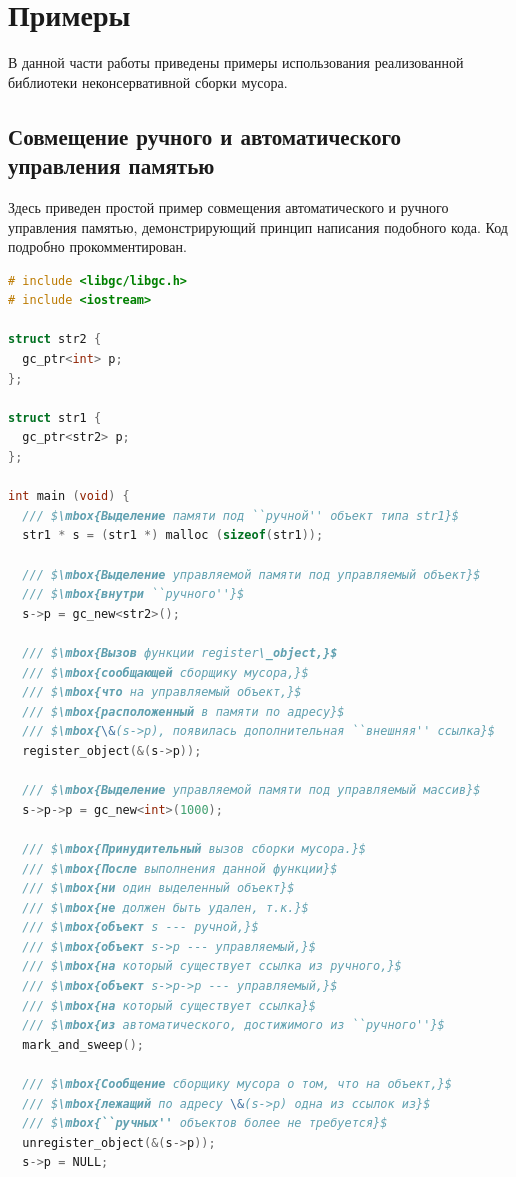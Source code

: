 \section{Примеры}
В данной части работы приведены примеры использования реализованной библиотеки неконсервативной сборки мусора.

\subsection{Совмещение ручного и автоматического управления памятью}
Здесь приведен простой пример совмещения автоматического и ручного управления памятью,
демонстрирующий принцип написания подобного кода.
Код подробно прокомментирован.

\begin{lstlisting}[language=cpp, mathescape=true]
# include <libgc/libgc.h>
# include <iostream>

struct str2 {
  gc_ptr<int> p;
};

struct str1 {
  gc_ptr<str2> p;
};

int main (void) {
  /// $\mbox{Выделение памяти под ``ручной'' объект типа str1}$
  str1 * s = (str1 *) malloc (sizeof(str1));

  /// $\mbox{Выделение управляемой памяти под управляемый объект}$
  /// $\mbox{внутри ``ручного''}$
  s->p = gc_new<str2>();

  /// $\mbox{Вызов функции register\_object,}$
  /// $\mbox{сообщающей сборщику мусора,}$
  /// $\mbox{что на управляемый объект,}$
  /// $\mbox{расположенный в памяти по адресу}$
  /// $\mbox{\&(s->p), появилась дополнительная ``внешняя'' ссылка}$
  register_object(&(s->p));

  /// $\mbox{Выделение управляемой памяти под управляемый массив}$
  s->p->p = gc_new<int>(1000);
  
  /// $\mbox{Принудительный вызов сборки мусора.}$
  /// $\mbox{После выполнения данной функции}$
  /// $\mbox{ни один выделенный объект}$
  /// $\mbox{не должен быть удален, т.к.}$
  /// $\mbox{объект s --- ручной,}$
  /// $\mbox{объект s->p --- управляемый,}$
  /// $\mbox{на который существует ссылка из ручного,}$
  /// $\mbox{объект s->p->p --- управляемый,}$
  /// $\mbox{на который существует ссылка}$
  /// $\mbox{из автоматического, достижимого из ``ручного''}$
  mark_and_sweep();
  
  /// $\mbox{Сообщение сборщику мусора о том, что на объект,}$
  /// $\mbox{лежащий по адресу \&(s->p) одна из ссылок из}$
  /// $\mbox{``ручных'' объектов более не требуется}$
  unregister_object(&(s->p));
  s->p = NULL;
  

\end{lstlisting}
